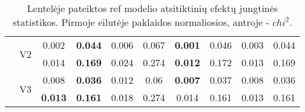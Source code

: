 \documentclass[12pt,a4paper]{article}
\begin{document}
\begin{sidewaystable}[ht]
{\begin{tabular}{cc|cc|cc|cc|cc|}
   & \multirow{2}{*}{V2} & 0.002 & \textbf{0.044} & 0.006 & 0.067 & \textbf{0.001} & 0.046 & 0.003 & 0.044 \\ 
   &  & 0.014 & \textbf{0.169} & 0.024 & 0.274 & \textbf{0.012} & 0.172 & 0.013 & 0.169 \\ 
   & \multirow{2}{*}{V3} & 0.008 & \textbf{0.036} & 0.012 & 0.06 & \textbf{0.007} & 0.037 & 0.008 & 0.036 \\ 
   &  & \textbf{0.013} & \textbf{0.161} & 0.018 & 0.274 & 0.014 & 0.161 & 0.013 & 0.161 \\ 
   \hline
\end{tabular}
}
\caption{Lentelėje pateiktos ref modelio atsitiktinių efektų jungtinės statistikos. Pirmoje eilutėje paklaidos normaliosios, antroje - $chi^2$.}
\end{sidewaystable}
\end{document}
